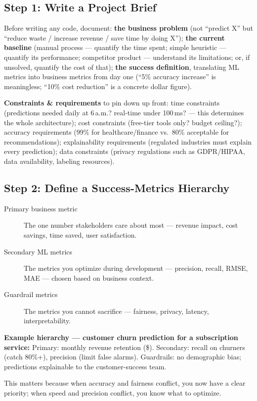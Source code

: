 \subsection{Step 1: Write a Project Brief}

Before writing any code, document: \textbf{the business problem} (not ``predict X'' but ``reduce waste / increase
revenue / save time by doing X''); \textbf{the current baseline} (manual process --- quantify the time spent;
simple heuristic --- quantify its performance; competitor product --- understand its limitations; or, if
unsolved, quantify the cost of that); \textbf{the success definition}, translating ML metrics into business
metrics from day one (``5\% accuracy increase'' is meaningless; ``10\% cost reduction'' is a concrete dollar
figure).

\textbf{Constraints \& requirements} to pin down up front: time constraints (predictions needed daily at 6\,a.m.?
real-time under 100\,ms? --- this determines the whole architecture); cost constraints (free-tier tools only?
budget ceiling?); accuracy requirements (99\% for healthcare/finance vs.\ 80\% acceptable for recommendations);
explainability requirements (regulated industries must explain every prediction); data constraints (privacy
regulations such as GDPR/HIPAA, data availability, labeling resources).

\subsection{Step 2: Define a Success-Metrics Hierarchy}

\begin{description}
  \item[Primary business metric] The one number stakeholders care about most --- revenue impact, cost savings,
  time saved, user satisfaction.
  \item[Secondary ML metrics] The metrics you optimize during development --- precision, recall, RMSE, MAE ---
  chosen based on business context.
  \item[Guardrail metrics] The metrics you cannot sacrifice --- fairness, privacy, latency, interpretability.
\end{description}

\begin{example}
\textbf{Example hierarchy --- customer churn prediction for a subscription service:}
Primary: monthly revenue retention (\$). Secondary: recall on churners (catch 80\%+), precision (limit false
alarms). Guardrails: no demographic bias; predictions explainable to the customer-success team.

This matters because when accuracy and fairness conflict, you now have a clear priority; when speed and precision
conflict, you know what to optimize.
\end{example}

